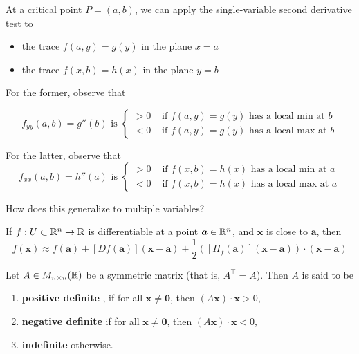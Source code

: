 \begin{remark}
    At a critical point $P = (a,b)$, we can apply the single-variable second derivative test to
    
    \begin{itemize}
        \item the trace $f(a,y) = g(y)$ in the plane $x=a$
        \item the trace $f(x,b) = h(x)$ in the plane $y=b$
    \end{itemize}

    For the former, observe that 
    
    $$f_{yy}(a,b) = g''(b) \text{ is } \left\{
    \begin{array}{ll}
			> 0  & \text{ if } f(a,y) = g(y) \text{ has a local min at } b \\
			< 0  & \text{ if } f(a,y) = g(y) \text{ has a local max at } b
		\end{array}
		\right.$$

  For the latter, observe that
	$$f_{xx}(a,b) = h''(a) \text{ is } \left\{
		\begin{array}{ll}
			> 0  & \text{ if } f(x,b) = h(x) \text{ has a local min at } a \\
			< 0  & \text{ if } f(x,b) = h(x) \text{ has a local max at } a
		\end{array}
		\right.$$

    \end{remark}



\begin{motivating}
        How does this generalize to multiple variables?
    \end{motivating}

\begin{theorem}
    
    If $f : U \subset \mathbb{R}^n \to \mathbb{R}$ is \underline{differentiable} at a point $\bm{a} \in \mathbb{R}^n$, and $\bm{x}$ is close to $\bm{a}$, then 
    $$f(\bm{x}) \approx f(\bm{a}) + [Df(\bm{a})](\bm{x-a}) + \frac{1}{2}\left([H_f(\bm{a})](\bm{x-a})\right) \cdot (\bm{x-a}) $$
    
    \end{theorem}

\begin{definition}
    Let $A \in M_{n \times n}(\mathbb{R})$ be a symmetric matrix (that is, $A^\intercal = A$). Then $A$ is said to be
    
    \begin{enumerate}
        \item \textbf{positive definite} , if for all $\bm{x} \neq \bm{0}$, then $(A\bm{x}) \cdot \bm{x} > 0$,
        \item \textbf{negative definite} if for all $\bm{x} \neq \bm{0}$, then $(A\bm{x}) \cdot \bm{x} < 0$,
        \item \textbf{indefinite} otherwise.
    \end{enumerate}
    
    \end{definition}

